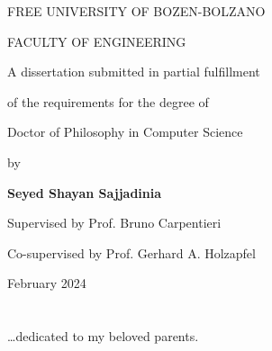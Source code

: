 
\usepackage[titletoc]{appendix}
\usepackage{enumitem}
\usepackage{calc}
\usepackage{rotating}

\usepackage[style=authoryear, sorting=nyt, maxcitenames=1]{biblatex}
\usepackage{amsmath}
\usepackage{amssymb}
\usepackage{upgreek}
\usepackage{graphicx}
\usepackage{bm}
\usepackage{titlesec}
\usepackage{booktabs}
\usepackage{longtable,color,caption}
\usepackage{fancyhdr} %
\renewcommand{\contentsname}{Table of Contents}
\graphicspath{{img/}}
\usepackage{float} %




\begin{titlepage}
    \centering
    \vspace*{1.5cm}
    \textsc{FREE UNIVERSITY OF BOZEN-BOLZANO}\par
    \textsc{FACULTY OF ENGINEERING}\par
    \vspace{2.5cm}
    {\LARGE\bfseries \par}
    \vspace{2cm}
    A dissertation submitted in partial fulfillment\par
    of the requirements for the degree of\par
    \vspace{0.5cm}
    {\Large Doctor of Philosophy in Computer Science\par}
    \vspace{2.5cm}
    by\par
    \vspace{0.5cm}
    {\Large \textbf{Seyed Shayan Sajjadinia}\par}
    \vspace{3cm}
    Supervised by Prof. Bruno Carpentieri\par
    Co-supervised by Prof. Gerhard A. Holzapfel\par
    \vspace{1.5cm}
    February 2024
\end{titlepage}

\thispagestyle{empty}
\mbox{}
\clearpage


\chapter*{}
\ldots dedicated to my beloved parents.


